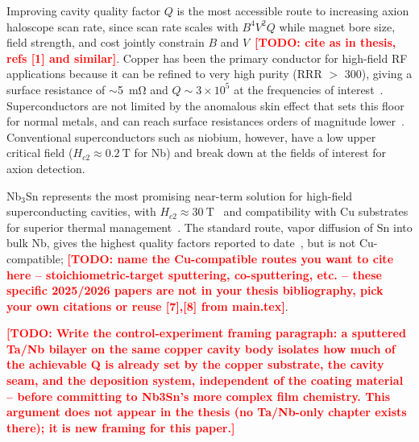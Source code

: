 \documentclass[10pt,journal]{IEEEtran}
\newcommand{\TODO}[1]{\textcolor{red}{\textbf{[TODO: #1]}}}
\begin{document}
Improving cavity quality factor $Q$ is the most accessible route to increasing axion haloscope scan rate, since scan rate scales with $B^4 V^2 Q$ while magnet bore size, field strength, and cost jointly constrain $B$ and $V$~\TODO{cite as in thesis, refs [1] and similar}. Copper has been the primary conductor for high-field RF applications because it can be refined to very high purity (RRR $>$ 300), giving a surface resistance of $\sim$\SI{5}{\milli\ohm} and $Q\sim3\times10^5$ at the frequencies of interest~\cite{ADMX:2009iij}. Superconductors are not limited by the anomalous skin effect that sets this floor for normal metals, and can reach surface resistances orders of magnitude lower~\cite{Ciovati:2014zti}. Conventional superconductors such as niobium, however, have a low upper critical field ($H_{c2}\approx\SI{0.2}{\tesla}$ for Nb) and break down at the fields of interest for axion detection.

Nb$_3$Sn represents the most promising near-term solution for high-field superconducting cavities, with $H_{c2}\approx\SI{30}{\tesla}$~\cite{gurevichUseNotUse2011} and compatibility with Cu substrates for superior thermal management~\cite{withanageRapidNbSn2021}. The standard route, vapor diffusion of Sn into bulk Nb, gives the highest quality factors reported to date~\cite{posenNb3SnSuperconductingRadiofrequency2017}, but is not Cu-compatible; \TODO{name the Cu-compatible routes you want to cite here -- stoichiometric-target sputtering, co-sputtering, etc. -- these specific 2025/2026 papers are not in your thesis bibliography, pick your own citations or reuse [7],[8] from main.tex}.

\TODO{Write the control-experiment framing paragraph: a sputtered Ta/Nb bilayer on the same copper cavity body isolates how much of the achievable Q is already set by the copper substrate, the cavity seam, and the deposition system, independent of the coating material -- before committing to Nb3Sn's more complex film chemistry. This argument does not appear in the thesis (no Ta/Nb-only chapter exists there); it is new framing for this paper.}
\end{document}
